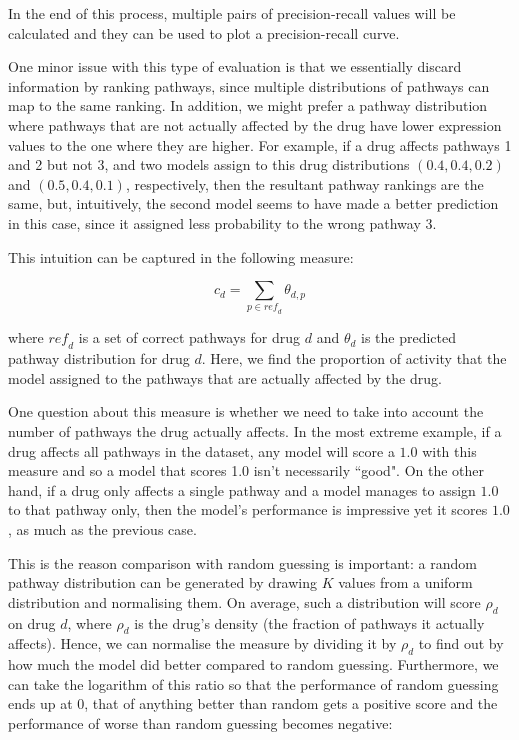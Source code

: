 \documentclass[12pt,a4paper,twoside,openright]{report}
\begin{document}
In the end of this process, multiple pairs of precision-recall values will be calculated and they can be used to plot a precision-recall curve.

One minor issue with this type of evaluation is that we essentially discard information by ranking pathways, since multiple distributions of pathways can map to the same ranking. In addition, we might prefer a pathway distribution where pathways that are not actually affected by the drug have lower expression values to the one where they are higher. For example, if a drug affects pathways 1 and 2 but not 3, and two models assign to this drug distributions $(0.4, 0.4, 0.2)$ and $(0.5, 0.4, 0.1)$, respectively, then the resultant pathway rankings are the same, but, intuitively, the second model seems to have made a better prediction in this case, since it assigned less probability to the wrong pathway 3.

This intuition can be captured in the following measure:

\begin{equation}
c_d = \sum\limits_{p \in \mathit{ref}_d}{\theta_{d, p}}
\end{equation}

where $\mathit{ref}_d$ is a set of correct pathways for drug $d$ and $\theta_d$ is the predicted pathway distribution for drug $d$. Here, we find the proportion of activity that the model assigned to the pathways that are actually affected by the drug.

One question about this measure is whether we need to take into account the number of pathways the drug actually affects. In the most extreme example, if a drug affects all pathways in the dataset, any model will score a $1.0$ with this measure and so a model that scores 1.0 isn't necessarily ``good". On the other hand, if a drug only affects a single pathway and a model manages to assign $1.0$ to that pathway only, then the model's performance is impressive yet it scores $1.0$, as much as the previous case.

This is the reason comparison with random guessing is important: a random pathway distribution can be generated by drawing $K$ values from a uniform distribution and normalising them. On average, such a distribution will score $\rho_d$ on drug $d$, where $\rho_d$ is the drug's density (the fraction of pathways it actually affects). Hence, we can normalise the measure by dividing it by $\rho_d$ to find out by how much the model did better compared to random guessing. Furthermore, we can take the logarithm of this ratio so that the performance of random guessing ends up at 0, that of anything better than random gets a positive score and the performance of worse than random guessing becomes negative:
\end{document}
